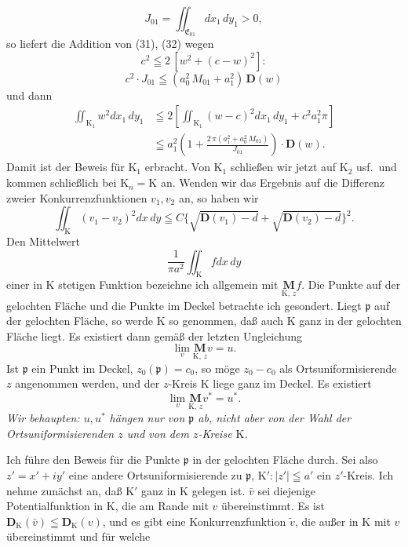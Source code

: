 \documentclass{article}
\begin{document}
\[ J_{01} = \iint_{\mathfrak{E}_{01}} dx_1\,dy_1 > 0, \]
so liefert die Addition von (31), (32) wegen
\[ c^2 \leqq 2\,[w^2 + (c - w)^2]\colon \]
\[ c^2 \cdot J_{01} \leqq (a_0^2\,M_{01} + a_1^2)\,\mathbf{D}(w) \]
und dann
\[ \begin{aligned}
\iint_{\mathrm{K}_1} w^2 dx_1\,dy_1 &\leqq 2 \left[ \iint_{\mathrm{K}_1} (w - c)^2 dx_1\,dy_1 + c^2 a_1^2\pi \right] \\
&\leqq a_1^2 \left( 1 + \frac{2\,\pi(a_1^2 + a_0^2\,M_{01})}{J_{01}} \right) \cdot \mathbf{D}(w).
\end{aligned} \]
Damit ist der Beweis für $\mathrm{K}_1$ erbracht. Von $\mathrm{K}_1$ schließen wir jetzt auf $\mathrm{K}_2$ usf.\ und kommen schließlich bei $\mathrm{K}_n = \mathrm{K}$ an. Wenden wir das Ergebnis auf die Differenz zweier Konkurrenzfunktionen $v_1, v_2$ an, so haben wir
\[ \iint_{\mathrm{K}} (v_1 - v_2)^2 dx\,dy \leqq C \bigl\{ \sqrt{\mathbf{D}(v_1) - d} + \sqrt{\mathbf{D}(v_2) - d} \bigr\}^2. \tag{33} \]
Den Mittelwert
\[ \frac{1}{\pi a^2} \iint_{\mathrm{K}} f dx\,dy \]
einer in $\mathrm{K}$ stetigen Funktion bezeichne ich allgemein mit $\underset{\mathrm{K},\,z}{\mathbf{M}} f$. Die Punkte auf der gelochten Fläche und die Punkte im Deckel betrachte ich gesondert. Liegt $\mathfrak{p}$ auf der gelochten Fläche, so werde $\mathrm{K}$ so genommen, daß auch $\mathrm{K}$ ganz in der gelochten Fläche liegt. Es existiert dann gemäß der letzten Ungleichung
\[ \lim_v \underset{\mathrm{K},\,z}{\mathbf{M}} v = u. \]
Ist $\mathfrak{p}$ ein Punkt im Deckel, $z_0(\mathfrak{p}) = c_0$, so möge $z_0 - c_0$ als Ortsuniformisierende $z$ angenommen werden, und der $z$-Kreis $\mathrm{K}$ liege ganz im Deckel. Es existiert
\[ \lim_v \underset{\mathrm{K},\,z}{\mathbf{M}} v^* = u^*. \]
\emph{Wir behaupten: $u, u^*$ hängen nur von $\mathfrak{p}$ ab, nicht aber von der Wahl der Ortsuniformisierenden $z$ und von dem $z$-Kreise $\mathrm{K}$.}

Ich führe den Beweis für die Punkte $\mathfrak{p}$ in der gelochten Fläche durch. Sei also $z' = x' + iy'$ eine andere Ortsuniformisierende zu $\mathfrak{p}$, $\mathrm{K}' : |z'| \leqq a'$ ein $z'$-Kreis. Ich nehme zunächst an, daß $\mathrm{K}'$ ganz in $\mathrm{K}$ gelegen ist. $\bar{v}$ sei diejenige Potentialfunktion in $\mathrm{K}$, die am Rande mit $v$ übereinstimmt. Es ist $\mathbf{D}_{\mathrm{K}}(\bar{v}) \leqq \mathbf{D}_{\mathrm{K}}(v)$, und es gibt eine Konkurrenzfunktion $\tilde{v}$, die außer in $\mathrm{K}$ mit $v$ übereinstimmt und für welche
\end{document}
